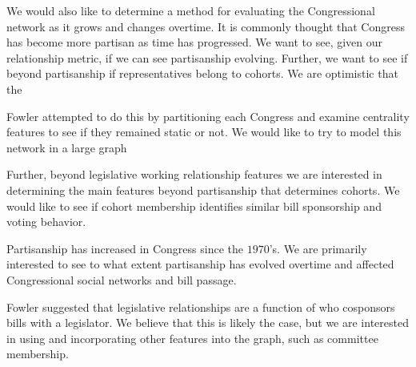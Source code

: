 We would also like to determine a method for evaluating the Congressional
network as it grows and changes overtime. It is commonly thought that Congress
has become more partisan as time has progressed. We want to see, given our
relationship metric, if we can see partisanship evolving. Further, we want to
see if beyond partisanship if representatives belong to cohorts. We are
optimistic that the

Fowler attempted to do this by  partitioning each Congress and examine
centrality features to see if they  remained static or not. We would like to try
to model this network in a  large graph

Further, beyond legislative working relationship features we are interested in
determining the main features beyond partisanship that determines cohorts. We
would like to see if cohort membership identifies similar bill sponsorship and
voting behavior.

Partisanship has increased in Congress since the $1970$'s. We are primarily
interested to see to what extent partisanship has evolved overtime and affected
Congressional social networks and bill passage.

Fowler suggested that legislative relationships are a function  of who
cosponsors bills with a legislator. We believe that this is likely the  case,
but we are interested in using and incorporating other features into  the graph,
such as committee membership.
